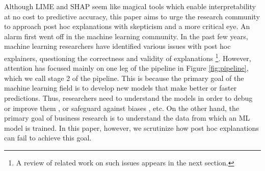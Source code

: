 \documentclass[mnsc,blindrev]{informs3}
\begin{document}
Although  LIME and SHAP seem like magical tools which enable interpretability at no cost to predictive accuracy, this paper aims to urge the research community to approach post hoc explanations with skepticism and a more critical eye. An alarm first went off in the machine learning community. In the past few years, machine learning researchers have identified various issues with post hoc explainers, questioning the correctness and validity of explanations \footnote{A review of related work on such issues appears in the next section.}. %
However, attention has focused mainly on one leg of the pipeline in Figure \ref{fig:pipeline}, which we call stage 2 of the pipeline. %
This is because the primary goal of the machine learning field is to develop new models that make better or faster predictions. Thus, researchers need to understand the models in order to debug or improve them \citep{lertvittayakumjorn21explanation}, or safeguard against biases \citep{alves21reducing}, etc. On the other hand, the primary goal of business research is to understand the data from which an ML model is trained. In this paper, however, we scrutinize how post hoc explanations can fail to achieve this goal.
\end{document}
